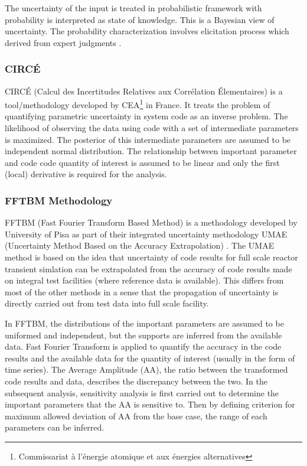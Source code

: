 \documentclass[11pt,titlepage]{article}
\begin{document}
The uncertainty of the input is treated in probabilistic framework with probability is interpreted as state of knowledge. 
This is a Bayesian view of uncertainty. 
The probability characterization involves elicitation process which derived from expert judgments \cite{Glaeser1994}. 

\subsubsection{CIRCÉ}

CIRCÉ (Calcul des Incertitudes Relatives aux Corrélation Élementaires) is a tool/methodology developed by CEA\footnote{Commissariat à l'énergie atomique et aux énergies alternatives} in France. 
It treats the problem of quantifying parametric uncertainty in system code as an inverse problem. 
The likelihood of observing the data using code with a set of intermediate parameters is maximized. 
The posterior of this intermediate parameters are assumed to be independent normal distribution. 
The relationship between important parameter and code code quantity of interest is assumed to be linear and only the first (local) derivative is required for the analysis.

\subsubsection{FFTBM Methodology}

FFTBM (Fast Fourier Transform Based Method) is a methodology developed by University of Pisa as part of their integrated uncertainty methodology UMAE (Uncertainty Method Based on the Accuracy Extrapolation) \cite{Prosek2002,DAuria1998}. 
The UMAE method is based on the idea that uncertainty of code results for full scale reactor transient simlation can be extrapolated from the accuracy of code results made on integral test facilities (where reference data is available). 
This differs from most of the other methods in a sense that the propagation of uncertainty is directly carried out from test data into full scale facility.

In FFTBM, the distributions of the important parameters are assumed to be uniformed and independent, but the supports are inferred from the available data. 
Fast Fourier Transform is applied to quantify the accuracy in the code results and the available data for the quantity of interest (usually in the form of time series). 
The Average Amplitude (AA), the ratio between the transformed code results and data, describes the discrepancy between the two. 
In the subsequent analysis, sensitivity analysis is first carried out to determine the important parameters that the AA is sensitive to. 
Then by defining criterion for maximum allowed deviation of AA from the base case, the range of each parameters can be inferred.
\end{document}
